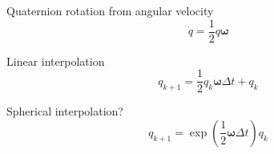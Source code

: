 \documentclass{amsart}
\theoremstyle{definition}
\theoremstyle{remark}
\numberwithin{equation}{section}
\begin{document}
Quaternion rotation from angular velocity
\begin{equation}
  \dot{q} = \frac{1}{2} q\boldsymbol\omega
\end{equation}

Linear interpolation
\begin{equation}
  q_{k+1} = \frac{1}{2}q_k\boldsymbol\omega\Delta t + q_k 
\end{equation}

Spherical interpolation?
\begin{equation}
  q_{k+1} = \exp\left(\frac{1}{2} \boldsymbol\omega\Delta t\right)q_k
\end{equation}
\end{document}
